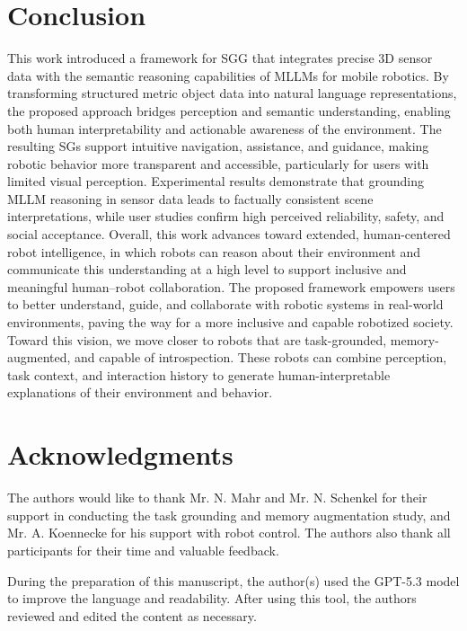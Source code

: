 \documentclass[lettersize,journal]{IEEEtran}
\begin{document}
\section{Conclusion}\label{conclusion}

This work introduced a framework for SGG that integrates precise 3D sensor data with the semantic reasoning capabilities of MLLMs for mobile robotics. By transforming structured metric object data into natural language representations, the proposed approach bridges perception and semantic understanding, enabling both human interpretability and actionable awareness of the environment. The resulting SGs support intuitive navigation, assistance, and guidance, making robotic behavior more transparent and accessible, particularly for users with limited visual perception. Experimental results demonstrate that grounding MLLM reasoning in sensor data leads to factually consistent scene interpretations, while user studies confirm high perceived reliability, safety, and social acceptance. Overall, this work advances toward extended, human-centered robot intelligence, in which robots can reason about their environment and communicate this understanding at a high level to support inclusive and meaningful human–robot collaboration. The proposed framework empowers users to better understand, guide, and collaborate with robotic systems in real-world environments, paving the way for a more inclusive and capable robotized society. Toward this vision, we move closer to robots that are task-grounded, memory-augmented, and capable of introspection. These robots can combine perception, task context, and interaction history to generate human-interpretable explanations of their environment and behavior.

\section*{Acknowledgments}
The authors would like to thank Mr. N. Mahr and Mr. N. Schenkel for their support in conducting the task grounding and memory augmentation study, and Mr. A. Koennecke for his support with robot control. The authors also thank all participants for their time and valuable feedback.

During the preparation of this manuscript, the author(s) used the GPT-5.3 model to improve the language and readability. After using this tool, the authors reviewed and edited the content as necessary. 









\vfill
\end{document}
